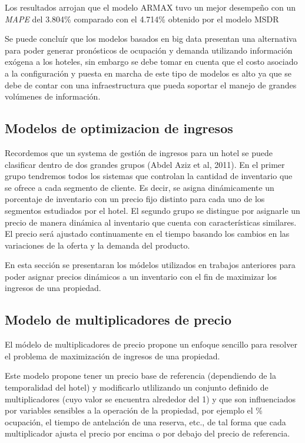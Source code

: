 {Los resultados arrojan que el modelo ARMAX tuvo un mejor desempeño con un \emph{MAPE} del 3.804\% comparado con el 4.714\% obtenido por el modelo MSDR

Se puede concluír que los modelos basados en big data presentan una alternativa para poder generar pronósticos de ocupación y demanda utilizando información exógena a los hoteles, sin embargo se debe tomar en cuenta que el costo asociado a la configuración y puesta en marcha de este tipo de modelos es alto ya que se debe de contar con una infraestructura que pueda soportar el manejo de grandes volúmenes de información.


\subsection*{Modelos de optimizacion de ingresos}

Recordemos que un systema de gestión de ingresos para un hotel se puede clasificar dentro de dos grandes grupos (Abdel Aziz et al, 2011). En el primer grupo tendremos todos los sistemas que controlan la cantidad de inventario que se ofrece a cada segmento de cliente. Es decir, se asigna dinámicamente un porcentaje de inventario con un precio fijo distinto para cada uno de los segmentos estudiados por el hotel. El segundo grupo se distingue por asignarle un precio de manera dinámica al inventario que cuenta con características similares. El precio será ajustado continuamente en el tiempo basando los cambios en las variaciones de la oferta y la demanda del producto.

En esta sección se presentaran los módelos utilizados en trabajos anteriores para poder asignar precios dinámicos a un inventario con el fin de maximizar los ingresos de una propiedad.

\subsection*{Modelo de multiplicadores de precio}

El módelo de multiplicadores de precio propone un enfoque sencillo para resolver el problema de maximización de ingresos de una propiedad.

Este modelo propone tener un precio base de referencia (dependiendo de la temporalidad del hotel) y modificarlo utlilizando un conjunto definido de multiplicadores (cuyo valor se encuentra alrededor del 1) y que son influenciados por variables sensibles a la operación de la propiedad, por ejemplo el \% ocupación, el tiempo de antelación de una reserva, etc., de tal forma que cada multiplicador ajusta el precio por encima o por debajo del precio de referencia. 

}
